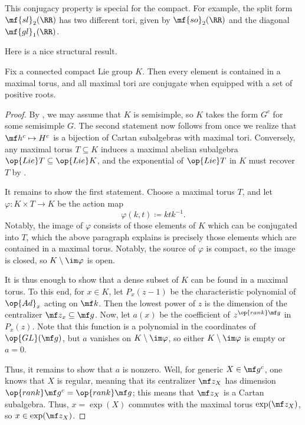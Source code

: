 \documentclass[../notes.tex]{subfiles}
\begin{document}
\begin{remark}
	This conjugacy property is special for the compact. For example, the split form $\mf{sl}_2(\RR)$ has two different tori, given by $\mf{so}_2(\RR)$ and the diagonal $\mf{gl}_1(\RR)$.
\end{remark}
Here is a nice structural result.
\begin{theorem} \label{thm:find-element-in-torus}
	Fix a connected compact Lie group $K$. Then every element is contained in a maximal torus, and all maximal tori are conjugate when equipped with a set of positive roots.
\end{theorem}
\begin{proof}
	By , we may assume that $K$ is semisimple, so $K$ takes the form $G^c$ for some semisimple $G$. The second statement now follows from  once we realize that $\mf h^c\mapsto H^c$ is a bijection of Cartan subalgebras with maximal tori. Conversely, any maximal torus $T\subseteq K$ induces a maximal abelian subalgebra $\op{Lie}T\subseteq\op{Lie}K$, and the exponential of $\op{Lie}T$ in $K$ must recover $T$ by .

	It remains to show the first statement. Choose a maximal torus $T$, and let $\varphi\colon K\times T\to K$ be the action map
	\[\varphi(k,t)\coloneqq ktk^{-1}.\]
	Notably, the image of $\varphi$ consists of those elements of $K$ which can be conjugated into $T$, which the above paragraph explains is precisely those elements which are contained in a maximal torus. Notably, the source of $\varphi$ is compact, so the image is closed, so $K\setminus\im\varphi$ is open.

	It is thus enough to show that a dense subset of $K$ can be found in a maximal torus. To this end, for $x\in K$, let $P_x(z-1)$ be the characteristic polynomial of $\op{Ad}_x$ acting on $\mf k$. Then the lowest power of $z$ is the dimension of the centralizer $\mf z_x\subseteq\mf g$. Now, let $a(x)$ be the coefficient of $z^{\op{rank}\mf g}$ in $P_x(z)$. Note that this function is a polynomial in the coordinates of $\op{GL}(\mf g)$, but $a$ vanishes on $K\setminus\im\varphi$, so either $K\setminus\im\varphi$ is empty or $a=0$.
	
	Thus, it remains to show that $a$ is nonzero. Well, for generic $X\in\mf g^c$, one knows that $X$ is regular, meaning that its centralizer $\mf z_X$ has dimension $\op{rank}\mf g^c=\op{rank}\mf g$; this means that $\mf z_X$ is a Cartan subalgebra. Thus, $x=\exp(X)$ commutes with the maximal torus $\exp(\mf z_X)$, so $x\in\exp(\mf z_X)$.
\end{proof}
\end{document}
